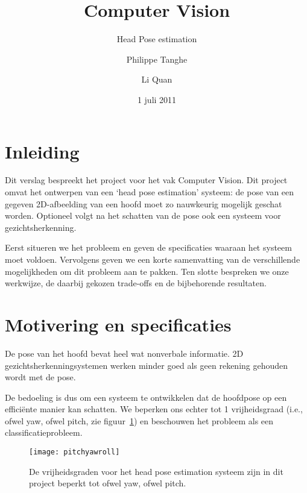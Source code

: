 \documentclass[a4paper,dutch,11pt,]{scrartcl}
\title{Computer Vision}
\subtitle{Head Pose estimation}
\author{Philippe Tanghe \and Li Quan}
\date{1 juli 2011}
\begin{document}
\maketitle



\tableofcontents
\clearpage
\section{Inleiding}
Dit verslag bespreekt het project voor het vak Computer Vision. Dit project omvat het ontwerpen van een `head pose estimation' systeem: de pose van een gegeven 2D-afbeelding van een hoofd moet zo nauwkeurig mogelijk geschat worden. Optioneel volgt na het schatten van de pose ook een systeem voor gezichtsherkenning. 

Eerst situeren we het probleem en geven de specificaties waaraan het systeem moet voldoen. Vervolgens geven we een korte samenvatting van de verschillende mogelijkheden om dit probleem aan te pakken. Ten slotte bespreken we onze werkwijze, de daarbij gekozen trade-offs en de bijbehorende resultaten.

\section{Motivering en specificaties}
De pose van het hoofd bevat heel wat nonverbale informatie. 2D gezichtsherkenningsystemen werken minder goed als geen rekening gehouden wordt met de pose. 

De bedoeling is dus om een systeem te ontwikkelen dat de hoofdpose op een effici\"ente manier kan schatten. We beperken ons echter tot 1 vrijheidsgraad (i.e., ofwel yaw, ofwel pitch, zie figuur~\ref{fig:pitchyawroll}) en beschouwen het probleem als een classificatieprobleem.

\begin{figure}[hbpt] \centering
 \texttt{[image: pitchyawroll]}
 \caption{De vrijheidsgraden voor het head pose estimation systeem zijn in dit project beperkt tot ofwel yaw, ofwel pitch. \cite{overview}}
 \label{fig:pitchyawroll}
\end{figure}
\end{document}
